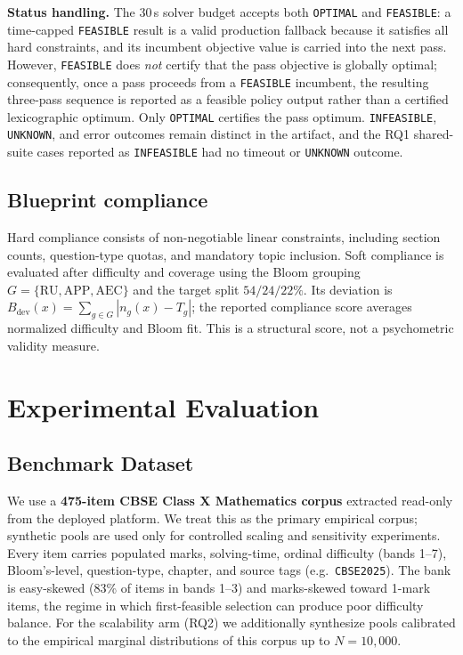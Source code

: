 \documentclass[runningheads]{llncs}
\begin{document}
\noindent\textbf{Status handling.} The 30\,s solver budget accepts both \texttt{OPTIMAL} and \texttt{FEASIBLE}: a time-capped \texttt{FEASIBLE} result is a valid production fallback because it satisfies all hard constraints, and its incumbent objective value is carried into the next pass.
However, \texttt{FEASIBLE} does \emph{not} certify that the pass objective is globally optimal;
consequently, once a pass proceeds from a \texttt{FEASIBLE} incumbent, the resulting three-pass sequence is reported as a feasible policy output rather than a certified lexicographic optimum.
Only \texttt{OPTIMAL} certifies the pass optimum. \texttt{INFEASIBLE}, \texttt{UNKNOWN}, and error outcomes remain distinct in the artifact, and the RQ1 shared-suite cases reported as \texttt{INFEASIBLE} had no timeout or \texttt{UNKNOWN} outcome.

\subsection{Blueprint compliance}
Hard compliance consists of non-negotiable linear constraints, including section counts, question-type quotas, and mandatory topic inclusion. Soft compliance is evaluated after difficulty and coverage using the Bloom grouping $G=\{\mathrm{RU},\mathrm{APP},\mathrm{AEC}\}$ and the target split $54/24/22\%$. Its deviation is $B_{\mathrm{dev}}(x)=\sum_{g\in G}|n_g(x)-T_g|$; the reported compliance score averages normalized difficulty and Bloom fit. This is a structural score, not a psychometric validity measure.

\section{Experimental Evaluation}
\label{sec:experiments}

\subsection{Benchmark Dataset}
\label{sec:dataset}
We use a \textbf{475-item CBSE Class X Mathematics corpus} extracted read-only from the deployed platform.
We treat this as the primary empirical corpus; synthetic pools are used only for controlled scaling and sensitivity experiments.
Every item carries populated marks, solving-time, ordinal difficulty (bands 1--7), Bloom's-level, question-type, chapter, and source tags (e.g.\ \texttt{CBSE2025}).
The bank is easy-skewed (83\% of items in bands 1--3) and marks-skewed toward 1-mark items, the regime in which first-feasible selection can produce poor difficulty balance.
For the scalability arm (RQ2) we additionally synthesize pools calibrated to the empirical marginal distributions of this corpus up to $N=10{,}000$.
\end{document}
